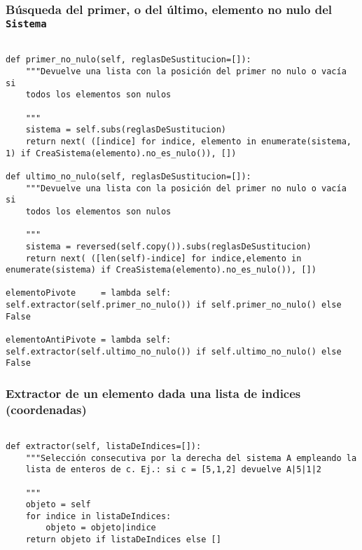 \documentclass[11pt]{report}
\begin{document}
\subsubsection{Búsqueda del primer, o del último, elemento no nulo del \texttt{Sistema}}
\label{sec:orgedf1330}

\begin{verbatim}

def primer_no_nulo(self, reglasDeSustitucion=[]):
    """Devuelve una lista con la posición del primer no nulo o vacía si
    todos los elementos son nulos

    """
    sistema = self.subs(reglasDeSustitucion)
    return next( ([indice] for indice, elemento in enumerate(sistema, 1) if CreaSistema(elemento).no_es_nulo()), [])

def ultimo_no_nulo(self, reglasDeSustitucion=[]):
    """Devuelve una lista con la posición del primer no nulo o vacía si
    todos los elementos son nulos

    """
    sistema = reversed(self.copy()).subs(reglasDeSustitucion)
    return next( ([len(self)-indice] for indice,elemento in enumerate(sistema) if CreaSistema(elemento).no_es_nulo()), [])

elementoPivote     = lambda self: self.extractor(self.primer_no_nulo()) if self.primer_no_nulo() else False

elementoAntiPivote = lambda self: self.extractor(self.ultimo_no_nulo()) if self.ultimo_no_nulo() else False

\end{verbatim}

\subsubsection{Extractor de un elemento dada una lista de indices (coordenadas)}
\label{sec:org414b84b}

\begin{verbatim}

def extractor(self, listaDeIndices=[]):
    """Selección consecutiva por la derecha del sistema A empleando la
    lista de enteros de c. Ej.: si c = [5,1,2] devuelve A|5|1|2

    """
    objeto = self
    for indice in listaDeIndices:
        objeto = objeto|indice
    return objeto if listaDeIndices else []

\end{verbatim}
\end{document}
